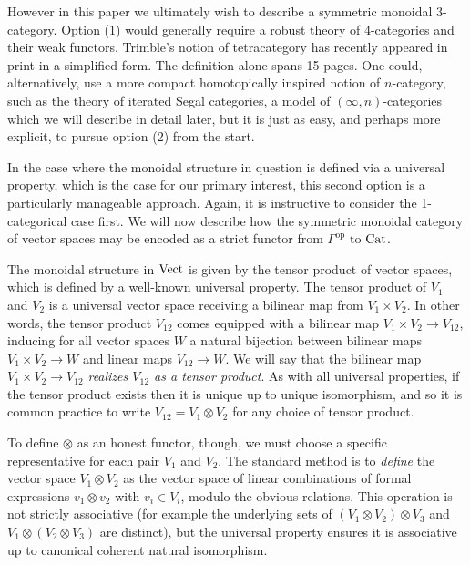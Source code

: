 \documentclass[a4paper]{amsart}
\begin{document}
However in this paper we ultimately wish to describe a symmetric monoidal 3-category. Option (1) would generally require a robust theory of 4-categories and their weak functors. Trimble's notion of tetracategory has recently appeared in print \cite{1112.0560} in a simplified form. The definition alone spans 15 pages. One could, alternatively, use a more compact homotopically inspired notion of $n$-category, such as the theory of iterated  Segal categories, a model of $(\infty, n)$-categories which we will describe in detail later, but it is just as easy, and perhaps more explicit, to pursue option (2) from the start. 

In the case where the monoidal structure in question is defined via a universal property, which is the case for our primary interest, this second option is a particularly manageable approach. Again, it is instructive to consider the 1-categorical case first. We will now describe how the symmetric monoidal category of vector spaces may be encoded as a strict functor from $\Gamma^\text{op}$ to $\mathrm{Cat}$. 

The monoidal structure in $\mathrm{Vect}$ is given by the tensor product of vector spaces, which is defined by a well-known universal property. The tensor product of $V_1$ and $ V_2$ is a universal vector space receiving a bilinear map from $V_1 \times V_2$. In other words, the tensor product $V_{12}$ comes equipped with a bilinear map  $V_1 \times V_2 \to V_{12}$, inducing for all vector spaces $W$ a natural bijection between bilinear maps $V_1 \times V_2 \to W$ and linear maps $V_{12} \to W$. We will say that the bilinear map  $V_1 \times V_2 \to V_{12}$ {\em realizes $V_{12}$ as a tensor product}. As with all universal properties, if the tensor product exists then it is unique up to unique isomorphism, and so it is common practice to write $V_{12} = V_1 \otimes V_2$ for any choice of tensor product.

To define $\otimes$ as an honest functor, though, we must choose a specific representative for each pair $V_1$ and $V_2$. The standard method is to {\em define} the vector space $V_1 \otimes V_2$ as the vector space of linear combinations of formal expressions $v_1 \otimes v_2$ with $v_i \in V_i$, modulo the obvious relations. This operation is not strictly associative (for example the underlying sets of $(V_1 \otimes V_2) \otimes V_3$ and $V_1 \otimes (V_2 \otimes V_3)$ are distinct), but the universal property ensures it is associative up to canonical coherent natural isomorphism.
\end{document}
